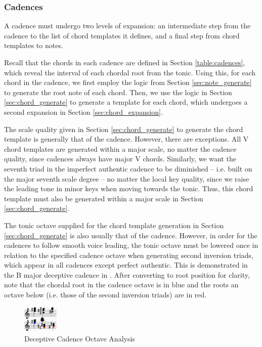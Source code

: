 \documentclass{article}
\begin{document}
\subsubsection{Cadences}
A cadence must undergo two levels of expansion: an intermediate step from the cadence to the list of chord templates it defines, and a final step from chord templates to notes.

Recall that the chords in each cadence are defined in Section \ref{table:cadences}, which reveal the interval of each chordal root from the tonic. Using this, for each chord in the cadence, we first employ the logic from Section \ref{sec:note_generate} to generate the root note of each chord. Then, we use the logic in Section \ref{sec:chord_generate} to generate a template for each chord, which undergoes a second expansion in Section \ref{sec:chord_expansion}.

The scale quality given in Section \ref{sec:chord_generate} to generate the chord template is generally that of the cadence. However, there are exceptions. All V chord templates are generated within a major scale, no matter the cadence quality, since cadences always have major V chords. Similarly, we want the seventh triad in the imperfect authentic cadence to be diminished – i.e. built on the major seventh scale degree – no matter the local key quality, since we raise the leading tone in minor keys when moving towards the tonic. Thus, this chord template must also be generated within a major scale in Section \ref{sec:chord_generate}.

The tonic octave supplied for the chord template generation in Section \ref{sec:chord_generate} is also usually that of the cadence. However, in order for the cadences to follow smooth voice leading, the tonic octave must be lowered once in relation to the specified cadence octave when generating second inversion triads, which appear in all cadences except perfect authentic. This is demonstrated in the B major deceptive cadence in . After converting to root position for clarity, note that the chordal root in the cadence octave is in blue and the roots an octave below (i.e. those of the second inversion triads) are in red.

\begin{figure}[h!]
\centering
\includegraphics[width=0.15\textwidth]{images/cadence_octaves}
  \caption{Deceptive Cadence Octave Analysis}\label{fig:cadence_octaves}
  \vspace{-3mm}
\end{figure}
\end{document}
